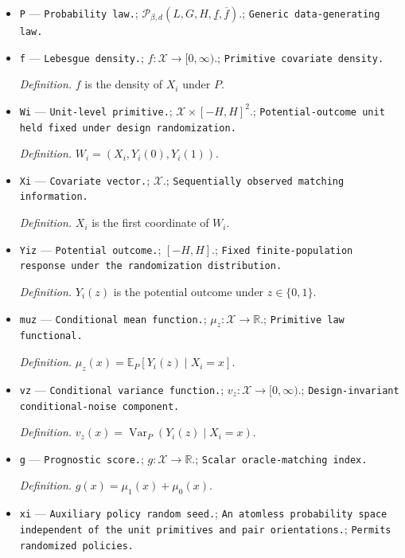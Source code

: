 \documentclass{article}
\begin{document}
\begin{itemize}
  \item \texttt{P} --- \texttt{Probability law.}; \(\mathcal P_{\beta,d}(L,G,H,\underline f,\overline f)\).; \texttt{Generic data-\allowbreak{}generating law.}
  \item \texttt{f} --- \texttt{Lebesgue density.}; \(f:\mathcal X\to[0,\infty)\).; \texttt{Primitive covariate density.}
  \par\smallskip\noindent\emph{Definition.} \(f\) is the density of \(X_i\) under \(P\).
  \item \texttt{Wi} --- \texttt{Unit-\allowbreak{}level primitive.}; \(\mathcal X\times[-H,H]^2\).; \texttt{Potential-\allowbreak{}outcome unit held fixed under design randomization.}
  \par\smallskip\noindent\emph{Definition.} \(W_i=(X_i,Y_i(0),Y_i(1))\).
  \item \texttt{Xi} --- \texttt{Covariate vector.}; \(\mathcal X\).; \texttt{Sequentially observed matching information.}
  \par\smallskip\noindent\emph{Definition.} \(X_i\) is the first coordinate of \(W_i\).
  \item \texttt{Yiz} --- \texttt{Potential outcome.}; \([-H,H]\).; \texttt{Fixed finite-\allowbreak{}population response under the randomization distribution.}
  \par\smallskip\noindent\emph{Definition.} \(Y_i(z)\) is the potential outcome under \(z\in\{0,1\}\).
  \item \texttt{muz} --- \texttt{Conditional mean function.}; \(\mu_z:\mathcal X\to\mathbb R\).; \texttt{Primitive law functional.}
  \par\smallskip\noindent\emph{Definition.} \(\mu_z(x)=\mathbb E_P[Y_i(z)\mid X_i=x]\).
  \item \texttt{vz} --- \texttt{Conditional variance function.}; \(v_z:\mathcal X\to[0,\infty)\).; \texttt{Design-\allowbreak{}invariant conditional-\allowbreak{}noise component.}
  \par\smallskip\noindent\emph{Definition.} \(v_z(x)=\operatorname{Var}_P(Y_i(z)\mid X_i=x)\).
  \item \texttt{g} --- \texttt{Prognostic score.}; \(g:\mathcal X\to\mathbb R\).; \texttt{Scalar oracle-\allowbreak{}matching index.}
  \par\smallskip\noindent\emph{Definition.} \(g(x)=\mu_1(x)+\mu_0(x)\).
  \item \texttt{xi} --- \texttt{Auxiliary policy random seed.}; \texttt{An atomless probability space independent of the unit primitives and pair orientations.}; \texttt{Permits randomized policies.}

\end{itemize}
\end{document}
